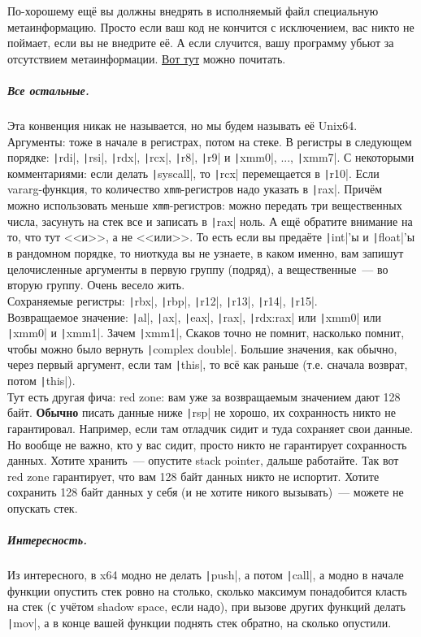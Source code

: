 \documentclass{article}
\begin{document}
    По-хорошему ещё вы должны внедрять в исполняемый файл специальную метаинформацию. Просто если ваш код не кончится с исключением, вас никто не поймает, если вы не внедрите её. А если случится, вашу программу убьют за отсутствием метаинформации. \href{https://learn.microsoft.com/en-us/cpp/build/x64-calling-convention?view=msvc-170#unwindability}{Вот тут} можно почитать.
    \subparagraph{Все остальные.}
    Эта конвенция никак не называется, но мы будем называть её Unix64.\\
    Аргументы: тоже в начале в регистрах, потом на стеке. В регистры в следующем порядке: \texttt|rdi|, \texttt|rsi|, \texttt|rdx|, \texttt|rcx|, \texttt|r8|, \texttt|r9| и \texttt|xmm0|, ..., \texttt|xmm7|. С некоторыми комментариями: если делать \texttt|syscall|, то \texttt|rcx| перемещается в \texttt|r10|. Если vararg-функция, то количество \Verb|xmm|-регистров надо указать в \texttt|rax|. Причём можно использовать меньше \Verb|xmm|-регистров: можно передать три вещественных числа, засунуть на стек все и записать в \texttt|rax| ноль. А ещё обратите внимание на то, что тут <<и>>, а не <<или>>. То есть если вы предаёте \texttt|int|'ы и \texttt|float|'ы в рандомном порядке, то ниоткуда вы не узнаете, в каком именно, вам запишут целочисленные аргументы в первую группу (подряд), а вещественные~--- во вторую группу. Очень весело жить.\\
    Сохраняемые регистры: \texttt|rbx|, \texttt|rbp|, \texttt|r12|, \texttt|r13|, \texttt|r14|, \texttt|r15|.\\
    Возвращаемое значение: \texttt|al|, \texttt|ax|, \texttt|eax|, \texttt|rax|, \texttt|rdx:rax| или \texttt|xmm0| или \texttt|xmm0| и \texttt|xmm1|. Зачем \texttt|xmm1|, Скаков точно не помнит, насколько помнит, чтобы можно было вернуть \texttt|complex double|. Большие значения, как обычно, через первый аргумент, если там \texttt|this|, то всё как раньше (т.е. сначала возврат, потом \texttt|this|).\\
    Тут есть другая фича: red zone: вам уже за возвращаемым значением дают 128 байт. \textbf{Обычно} писать данные ниже \texttt|rsp| не хорошо, их сохранность никто не гарантировал. Например, если там отладчик сидит и туда сохраняет свои данные. Но вообще не важно, кто у вас сидит, просто никто не гарантирует сохранность данных. Хотите хранить~--- опустите stack pointer, дальше работайте. Так вот red zone гарантирует, что вам 128 байт данных никто не испортит. Хотите сохранить 128 байт данных у себя (и не хотите никого вызывать)~--- можете не опускать стек.
    \subparagraph{Интересность.}
    Из интересного, в x64 модно не делать \texttt|push|, а потом \texttt|call|, а модно в начале функции опустить стек ровно на столько, сколько максимум понадобится класть на стек (с учётом shadow space, если надо), при вызове других функций делать \texttt|mov|, а в конце вашей функции поднять стек обратно, на сколько опустили.
\end{document}
